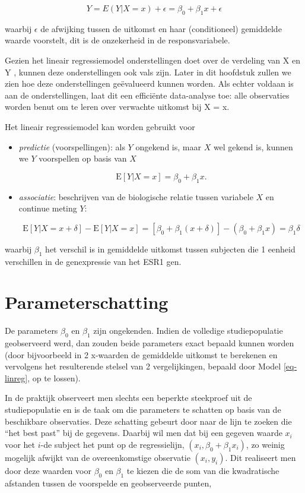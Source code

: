 \documentclass[
  dutch,
  letterpaper,
  12pt]{book}
\theoremstyle{definition}
\theoremstyle{definition}
\theoremstyle{definition}
\theoremstyle{remark}
\begin{document}
\[Y=E(Y|X=x)+\epsilon=\beta_0+\beta_1 x+\epsilon\]

waarbij \(\epsilon\) de afwijking tussen de uitkomst en haar
(conditioneel) gemiddelde waarde voorstelt, dit is de onzekerheid in de
responsvariabele.

Gezien het lineair regressiemodel onderstellingen doet over de verdeling
van X en Y , kunnen deze onderstellingen ook vals zijn. Later in dit
hoofdstuk zullen we zien hoe deze onderstellingen geëvalueerd kunnen
worden. Als echter voldaan is aan de onderstellingen, laat dit een
efficiënte data-analyse toe: alle observaties worden benut om te leren
over verwachte uitkomst bij X = x.

Het lineair regressiemodel kan worden gebruikt voor

\begin{itemize}
\item
  \emph{predictie} (voorspellingen): als \(Y\) ongekend is, maar \(X\)
  wel gekend is, kunnen we \(Y\) voorspellen op basis van \(X\)

  \[\text{E}\left[Y|X =x\right]=\beta_0 + \beta_1 x.\]
\item
  \emph{associatie}: beschrijven van de biologische relatie tussen
  variabele \(X\) en continue meting \(Y\):

  \[\text{E}\left[Y|X=x+\delta\right]-\text{E}\left[Y|X=x\right]= \left[\beta_0+\beta_1(x+\delta)\right]-(\beta_0+\beta_1x)=\beta_1\delta\]
\end{itemize}

waarbij \(\beta_1\) het verschil is in gemiddelde uitkomst tussen
subjecten die 1 eenheid verschillen in de genexpressie van het ESR1 gen.

\section{Parameterschatting}\label{parameterschatting}

De parameters \(\beta_0\) en \(\beta_1\) zijn ongekenden. Indien de
volledige studiepopulatie geobserveerd werd, dan zouden beide parameters
exact bepaald kunnen worden (door bijvoorbeeld in 2 x-waarden de
gemiddelde uitkomst te berekenen en vervolgens het resulterende stelsel
van 2 vergelijkingen, bepaald door Model \ref{eq-linreg}, op te lossen).

In de praktijk observeert men slechts een beperkte steekproef uit de
studiepopulatie en is de taak om die parameters te schatten op basis van
de beschikbare observaties. Deze schatting gebeurt door naar de lijn te
zoeken die ``het best past'' bij de gegevens. Daarbij wil men dat bij
een gegeven waarde \(x_i\) voor het \(i\)-de subject het punt op de
regressielijn, \((x_i, \beta_0 + \beta_1 x_i)\), zo weinig mogelijk
afwijkt van de overeenkomstige observatie \((x_i, y_i)\). Dit realiseert
men door deze waarden voor \(\beta_0\) en \(\beta_1\) te kiezen die de
som van die kwadratische afstanden tussen de voorspelde en geobserveerde
punten,
\end{document}
